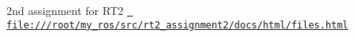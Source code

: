 2nd assignment for R\+T2 \href{file:///root/my_ros/src/rt2_assignment2/docs/html/files.html}{\texttt{ file\+:///root/my\+\_\+ros/src/rt2\+\_\+assignment2/docs/html/files.\+html}} 